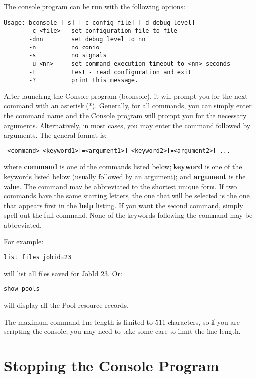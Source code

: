 The console program can be run with the following options:
\footnotesize
\begin{verbatim}
Usage: bconsole [-s] [-c config_file] [-d debug_level]
       -c <file>   set configuration file to file
       -dnn        set debug level to nn
       -n          no conio
       -s          no signals
       -u <nn>     set command execution timeout to <nn> seconds
       -t          test - read configuration and exit
       -?          print this message.
\end{verbatim}
\normalsize


After launching the Console program (bconsole), it will prompt you for the next
command with an asterisk (*).  Generally, for all commands, you can simply
enter the command name and the Console program will prompt you for the
necessary arguments. Alternatively, in most cases, you may enter the command
followed by arguments. The general format is:

\footnotesize
\begin{verbatim}
 <command> <keyword1>[=<argument1>] <keyword2>[=<argument2>] ...
\end{verbatim}
\normalsize

where {\bf command} is one of the commands listed below; {\bf keyword} is one
of the keywords listed below (usually followed by an argument); and {\bf
argument} is the value. The command may be abbreviated to the shortest unique
form. If two commands have the same starting letters, the one that will be
selected is the one that appears first in the {\bf help} listing. If you want
the second command, simply spell out the full command. None of the keywords
following the command may be abbreviated.

For example:

\footnotesize
\begin{verbatim}
list files jobid=23
\end{verbatim}
\normalsize

will list all files saved for JobId 23. Or:

\footnotesize
\begin{verbatim}
show pools
\end{verbatim}
\normalsize

will display all the Pool resource records.

The maximum command line length is limited to 511 characters, so if you
are scripting the console, you may need to take some care to limit the
line length.

\section{Stopping the Console Program}


